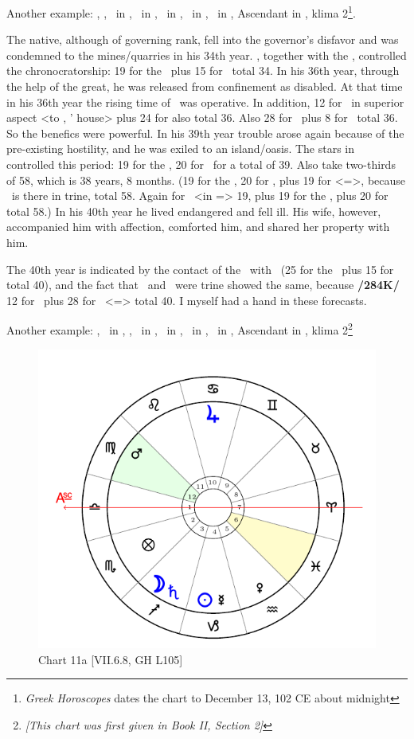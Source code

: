 Another example: \Sun, \Saturn, \Mercury\, in \Sagittarius, \Moon\, in \Cancer, \Jupiter\, in \Taurus, \Mars\, in \Leo, \Venus\, in \Capricorn, Ascendant in \Virgo, klima 2\footnote{\textit{Greek Horoscopes} dates the chart to December 13, 102 CE about midnight}.

The native, although of governing rank, fell into the governor’s disfavor and was condemned to the mines/quarries in his 34th year. \Mars, together with the \Sun, controlled the chronocratorship: 19 for the \Sun\, plus 15 for \Mars\, total 34. In his 36th year, through the help of the great, he was released from confinement as disabled. At that time in his 36th year the rising time of \Leo\, was operative. In addition, 12 for \Jupiter\, in superior aspect <to \Scorpio, \Mars’ house> plus 24 for \Taurus also total 36. Also 28 for \Capricorn\, plus 8 for \Venus\, total 36. So the benefics were powerful. In his 39th year trouble arose again because of the pre-existing hostility, and he was exiled to an island/oasis. The stars in \Sagittarius\, controlled this period: 19 for the \Sun, 20 for \Mercury\, for a total of 39. Also take two-thirds of 58, which is 38 years, 8 months. (19 for the \Sun, 20 for \Mercury, plus 19 for \Leo <=\Sun>, because \Mars\, is there in trine, total 58. Again for \Mars\, <in \Leo=\Sun> 19, plus 19 for the \Sun, plus 20 for \Mercury total 58.) In his 40th year he lived endangered and fell ill. His wife, however, accompanied him with affection, comforted him, and shared her property with him. 

The 40th year is indicated by the contact of the \Moon\, with \Mars\, (25 for the \Moon\, plus 15 for \Mars\, total 40), and the fact that \Jupiter\, and \Venus\, were trine showed the same, because \textbf{/284K/} 12 for \Jupiter\, plus 28 for \Venus\, <=\Capricorn> total 40. I myself had a hand in these forecasts.

Another example: \Sun, \Mercury\, in \Capricorn, \Moon, \Saturn\, in \Sagittarius, \Jupiter\, in \Cancer, \Mars\, in \Virgo, \Venus\, in \Aquarius, Ascendant in \Libra, klima 2\footnote{\textit{[This chart was first given in Book II, Section 2]}}

\begin{figure}
\centering
\vspace{0pt}
\includegraphics[width=.68\textwidth]{charts/2_21_11}
\caption{Chart 11a [VII.6.8, GH L105] }
\label{fig:chart11a}
\end{figure} 

